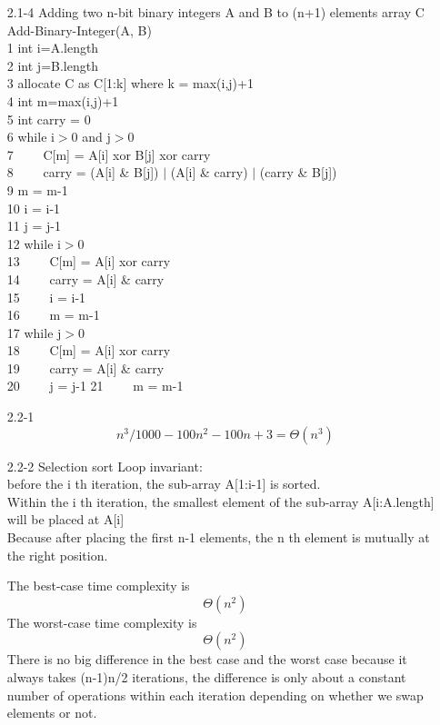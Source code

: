 \documentclass[]{article}
\begin{document}
\begin{enumerate}
\item[2.1-4] Adding two n-bit binary integers A and B to (n+1) elements array C\\

Add-Binary-Integer(A, B)\\
1 int i=A.length\\
2 int j=B.length\\
3 allocate C as C[1:k] where k = max(i,j)+1\\
4 int m=max(i,j)+1\\
5 int carry = 0\\
6 while i$>$0 and j$ > $0\\
7 \ \ \ \ C[m] = A[i] xor B[j] xor carry\\
8 \ \ \ \ carry = (A[i] \& B[j]) $|$ (A[i] \& carry) $|$ (carry \& B[j])\\
9  m = m-1\\
10 i = i-1\\
11 j = j-1\\
12 while i$>$0 \\
13 \ \ \ \ C[m] = A[i] xor carry\\
14 \ \ \ \ carry = A[i] \& carry\\
15 \ \ \ \ i = i-1\\
16 \ \ \ \ m = m-1\\
17 while j$>$0 \\
18 \ \ \ \ C[m] = A[i] xor carry\\
19 \ \ \ \ carry = A[i] \& carry\\
20 \ \ \ \ j = j-1
21 \ \ \ \ m = m-1\\

\item[2.2-1] $$ n^3/1000 - 100n^2 -100n +3 = \Theta(n^3) $$

\item[2.2-2] Selection sort Loop invariant:\\
 before the i th iteration, the sub-array A[1:i-1] is sorted.\\
Within the i th iteration, the smallest element of the sub-array A[i:A.length] will be placed at A[i]\\

\noindent
Because after placing the first n-1 elements, the n th element is mutually at the right position.

\noindent
The best-case time complexity is $$ \Theta(n^2) $$
The worst-case time complexity is $$ \Theta(n^2) $$
There is no big difference in the best case and the worst case because it always takes (n-1)n/2 iterations, the difference is only about a constant number of operations within each iteration depending on whether we swap elements or not.


\end{enumerate}
\end{document}
